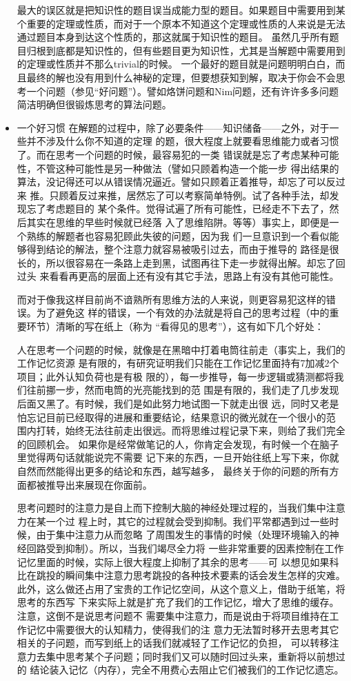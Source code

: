 \documentclass[11pt]{article}
\begin{document}
\begin{itemize}
最大的误区就是把知识性的题目误当成能力型的题目。如果题目中需要用到某个重要的定理或性质，而对于一个原本不知道这个定理或性质的人来说是无法通过题目本身到达这个性质的，那这就属于知识性的题目。
虽然几乎所有题目归根到底都是知识性的，但有些题目更为知识性，尤其是当解题中需要用到的定理或性质并不那么trivial的时候。
一个最好的题目就是问题明明白白，而且最终的解也没有用到什么神秘的定理，但要想获知到解，取决于你会不会思考一个问题（参见“好问题”）。譬如烙饼问题和Nim问题，还有许许多多问题简洁明确但很锻炼思考的算法问题。
\item 一个好习惯
\label{sec:orgheadline204}
在解题的过程中，除了必要条件——知识储备——之外，对于一些并不涉及什么你不知道的定理
的题，很大程度上就要看思维能力或者习惯了。而在思考一个问题的时候，最容易犯的一类
错误就是忘了考虑某种可能性，不管这种可能性是另一种做法（譬如只顾着构造一个能一步
得出结果的算法，没记得还可以从错误情况逼近。譬如只顾着正着推导，却忘了可以反过来
推。只顾着反过来推，居然忘了可以考察简单特例。试了各种手法，却发现忘了考虑题目的
某个条件。觉得试遍了所有可能性，已经走不下去了，然后其实在思维的早些时候就已经落
入了思维陷阱。等等）事实上，即便是一个熟练的解题者也容易犯顾此失彼的问题，因为我
们一旦意识到一个看似能够得到结论的解法，整个注意力就容易被吸引过去，而由于推导的
路径是很长的，所以很容易在一条路上走到黑，试图再往下走一步就得出解。却忘了回过头
来看看再更高的层面上还有没有其它手法，思路上有没有其他可能性。

而对于像我这样目前尚不谙熟所有思维方法的人来说，则更容易犯这样的错误。为了避免这
样的错误，一个有效的办法就是将自己的思考过程（中的重要环节）清晰的写在纸上（称为
“看得见的思考”），这有如下几个好处：

人在思考一个问题的时候，就像是在黑暗中打着电筒往前走（事实上，我们的工作记忆资源
是有限的，有研究证明我们只能在工作记忆里面持有7加减2个项目；此外认知负荷也是有极
限的），每一步推导，每一步逻辑或猜测都将我们往前挪一步，然而电筒的光亮能找到的范
围是有限的，我们走了几步发现后面又黑了。有时候，我们是如此努力地试图一下就走出很
远，同时又老是怕忘记目前已经取得的进展和重要结论，结果意识的微光就在一个很小的范
围内打转，始终无法往前走出很远。而将思维过程记录下来，则给了我们完全的回顾机会。
如果你是经常做笔记的人，你肯定会发现，有时候一个在脑子里觉得两句话就能说完不需要
记下来的东西，一旦开始往纸上写下来，你就自然而然能得出更多的结论和东西，越写越多，
最终关于你的问题的所有方面都被推导出来展现在你面前。

思考问题时的注意力是自上而下控制大脑的神经处理过程的，当我们集中注意力在某一个过
程上时，其它的过程就会受到抑制。我们平常都遇到过一些时候，由于集中注意力从而忽略
了周围发生的事情的时候（处理环境输入的神经回路受到抑制）。所以，当我们竭尽全力将
一些非常重要的因素控制在工作记忆里面的时候，实际上很大程度上抑制了其余的思考——可
以想见如果科比在跳投的瞬间集中注意力思考跳投的各种技术要素的话会发生怎样的灾难。
此外，这么做还占用了宝贵的工作记忆空间，从这个意义上，借助于纸笔，将思考的东西写
下来实际上就是扩充了我们的工作记忆，增大了思维的缓存。注意，这倒不是说思考问题不
需要集中注意力，而是说由于将项目维持在工作记忆中需要很大的认知精力，使得我们的注
意力无法暂时移开去思考其它相关的子问题，而写到纸上的话我们就减轻了工作记忆的负担，
可以转移注意力去集中思考某个子问题；同时我们又可以随时回过头来，重新将以前想过的
结论装入记忆（内存），完全不用费心去阻止它们被我们的工作记忆遗忘。


\end{itemize}
\end{document}

